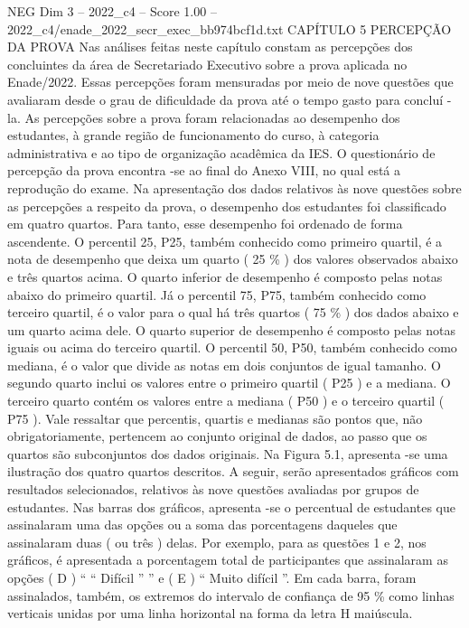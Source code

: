 \begin{textsample}{NEG Dim 3 – 2022\_c4 – Score 1.00 – 2022\_c4/enade\_2022\_secr\_exec\_bb974bcf1d.txt}  \label{ex:f3_neg_151}
CAPÍTULO 5 PERCEPÇÃO DA PROVA Nas análises feitas neste capítulo constam as percepções dos concluintes da área de Secretariado Executivo sobre a prova aplicada no Enade/2022.
Essas percepções foram mensuradas por meio de nove questões que avaliaram desde o grau de dificuldade da prova até o tempo gasto para concluí -la.
As percepções sobre a prova foram relacionadas ao desempenho dos estudantes, à grande região de funcionamento do curso, à categoria administrativa e ao tipo de organização acadêmica da IES.
O questionário de percepção da prova encontra -se ao final do Anexo VIII, no qual está a reprodução do exame.
Na apresentação dos dados relativos às nove questões sobre as percepções a respeito da prova, o desempenho dos estudantes foi classificado em quatro quartos.
Para tanto, esse desempenho foi ordenado de forma ascendente.
O percentil 25, P25, também conhecido como primeiro quartil, é a nota de desempenho que deixa um quarto ( 25 \% ) dos valores observados abaixo e três quartos acima.
O quarto inferior de desempenho é composto pelas notas abaixo do primeiro quartil.
Já o percentil 75, P75, também conhecido como terceiro quartil, é o valor para o qual há três quartos ( 75 \% ) dos dados abaixo e um quarto acima dele.
O quarto superior de desempenho é composto pelas notas iguais ou acima do terceiro quartil.
O percentil 50, P50, também conhecido como mediana, é o valor que divide as notas em dois conjuntos de igual tamanho.
O segundo quarto inclui os valores entre o primeiro quartil ( P25 ) e a mediana.
O terceiro quarto contém os valores entre a mediana ( P50 ) e o terceiro quartil ( P75 ).
Vale ressaltar que percentis, quartis e medianas são pontos que, não obrigatoriamente, pertencem ao conjunto original de dados, ao passo que os quartos são subconjuntos dos dados originais.
Na Figura 5.1, apresenta -se uma ilustração dos quatro quartos descritos.
A seguir, serão apresentados gráficos com resultados selecionados, relativos às nove questões avaliadas por grupos de estudantes.
Nas barras dos gráficos, apresenta -se o percentual de estudantes que assinalaram uma das opções ou a soma das porcentagens daqueles que assinalaram duas ( ou três ) delas.
Por exemplo, para as questões 1 e 2, nos gráficos, é apresentada a porcentagem total de participantes que assinalaram as opções ( D ) “ “ Difícil ” ” e ( E ) “ Muito difícil ”.
Em cada barra, foram assinalados, também, os extremos do intervalo de confiança de 95 \% como linhas verticais unidas por uma linha horizontal na forma da letra H maiúscula.

\end{textsample}
